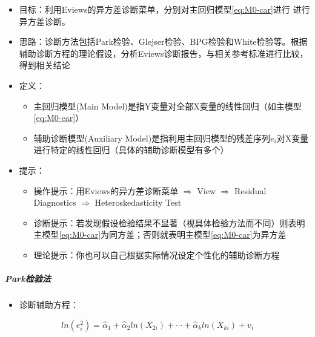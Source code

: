 \documentclass[12pt,(landscape,a4paper),(portrait,a4paper)]{article}
\providecommand{\tightlist}{%
  \setlength{\itemsep}{0pt}\setlength{\parskip}{0pt}}
\let\oldsubparagraph\subparagraph
\renewcommand{\subparagraph}[1]{\oldsubparagraph{#1}\mbox{}}
\begin{document}
\begin{itemize}
\item
  目标：利用Eviews的异方差诊断菜单，分别对主回归模型\eqref{eq:M0-car}进行
  进行异方差诊断。
\item
  思路：诊断方法包括Park检验、Glejser检验、BPG检验和White检验等。根据辅助诊断方程的理论假设，分析Eviews诊断报告，与相关参考标准进行比较，得到相关结论
\item
  定义：

  \begin{itemize}
  \tightlist
  \item
    主回归模型(Main
    Model)是指Y变量对全部X变量的线性回归（如主模型\eqref{eq:M0-car}）
  \item
    辅助诊断模型(Auxiliary
    Model)是指利用主回归模型的残差序列\(e_i\)对X变量进行特定的线性回归（具体的辅助诊断模型有多个）
  \end{itemize}
\item
  提示：

  \begin{itemize}
  \tightlist
  \item
    操作提示：用Eviews的异方差诊断菜单 \(\Rightarrow\) View
    \(\Rightarrow\) Residual Diagnostics \(\Rightarrow\)
    Heteroskedasticity Test
  \item
    诊断提示：若发现假设检验结果不显著（视具体检验方法而不同）则表明主模型\eqref{eq:M0-car}为同方差；否则就表明主模型\eqref{eq:M0-car}为异方差
  \item
    理论提示：你也可以自己根据实际情况设定个性化的辅助诊断方程
  \end{itemize}
\end{itemize}

\hypertarget{park}{%
\subparagraph{Park检验法}\label{park}}

\begin{itemize}
\tightlist
\item
  诊断辅助方程：
\end{itemize}

\begin{equation}
ln(e^2_i)=\hat{\alpha}_1+\hat{\alpha}_2ln(X_{2i})+\cdots+\hat{\alpha}_kln(X_{ki})+v_i \label{eq:A-park}
\end{equation}
\end{document}
